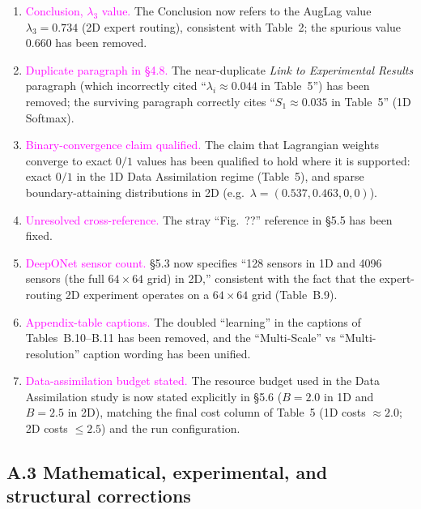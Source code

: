 \documentclass{article}
\newcommand{\audit}[1]{\textcolor{magenta}{#1}}  %
\begin{document}
\begin{enumerate}[leftmargin=*,itemsep=0.4em]
    \item \audit{Conclusion, $\lambda_3$ value.} The Conclusion now refers to
    the AugLag value $\lambda_3 = 0.734$ (2D expert routing), consistent with
    Table~2; the spurious value $0.660$ has been removed.

    \item \audit{Duplicate paragraph in \S4.8.} The near-duplicate
    \emph{Link to Experimental Results} paragraph (which incorrectly cited
    ``$\lambda_i \approx 0.044$ in Table~5'') has been removed; the surviving
    paragraph correctly cites ``$S_1 \approx 0.035$ in Table~5'' (1D Softmax).

    \item \audit{Binary-convergence claim qualified.} The claim that Lagrangian
    weights converge to exact $0/1$ values has been qualified to hold where it
    is supported: exact $0/1$ in the 1D Data Assimilation regime (Table~5), and
    sparse boundary-attaining distributions in 2D (e.g.\ $\lambda=(0.537,0.463,0,0)$).

    \item \audit{Unresolved cross-reference.} The stray ``Fig.~??'' reference in
    \S5.5 has been fixed.

    \item \audit{DeepONet sensor count.} \S5.3 now specifies ``128 sensors in 1D
    and 4096 sensors (the full $64\times 64$ grid) in 2D,'' consistent with the
    fact that the expert-routing 2D experiment operates on a $64\times64$ grid
    (Table~B.9).

    \item \audit{Appendix-table captions.} The doubled ``learning'' in the
    captions of Tables~B.10--B.11 has been removed, and the ``Multi-Scale'' vs
    ``Multi-resolution'' caption wording has been unified.

    \item \audit{Data-assimilation budget stated.} The resource budget used in
    the Data Assimilation study is now stated explicitly in \S5.6
    ($B=2.0$ in 1D and $B=2.5$ in 2D), matching the final cost column of
    Table~5 (1D costs $\approx 2.0$; 2D costs $\le 2.5$) and the run
    configuration.
\end{enumerate}

\subsection*{A.3 Mathematical, experimental, and structural corrections}
\end{document}
